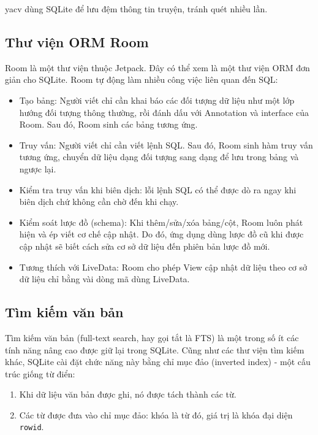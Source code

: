 \documentclass[../../thesis]{subfiles}
\begin{document}
yacv dùng SQLite để lưu đệm thông tin truyện, tránh quét nhiều lần.

\subsection{Thư viện ORM Room}\label{sec:room}

Room là một thư viện thuộc Jetpack. Đây có thể xem là một thư viện ORM đơn giản
cho SQLite. Room tự động làm nhiều công việc liên quan đến SQL:

\begin{itemize}
    \item
        Tạo bảng: Người viết chỉ cần khai báo các đối tượng dữ liệu như một lớp
        hướng đối tượng thông thường, rồi đánh dấu với Annotation và interface
        của Room. Sau đó, Room sinh các bảng tương ứng.
    \item
        Truy vấn: Người viết chỉ cần viết lệnh SQL. Sau đó, Room sinh hàm truy
        vấn tương ứng, chuyển dữ liệu dạng đối tượng sang dạng để lưu trong bảng
        và ngược lại.
    \item
        Kiểm tra truy vấn khi biên dịch: lỗi lệnh SQL có thể được dò ra ngay khi
        biên dịch chứ không cần chờ đến khi chạy.
    \item
        Kiểm soát lược đồ (schema): Khi thêm/sửa/xóa bảng/cột, Room luôn phát
        hiện và ép viết cơ chế cập nhật. Do đó, ứng dụng dùng lược đồ cũ khi
        được cập nhật sẽ biết cách sửa cơ sở dữ liệu đến phiên bản lược đồ mới.
    \item
        Tương thích với LiveData: Room cho phép View cập nhật dữ liệu theo cơ sở
        dữ liệu chỉ bằng vài dòng mã dùng LiveData.
\end{itemize}

\subsection{Tìm kiếm văn bản}\label{sec:fts}

Tìm kiếm văn bản (full-text search, hay gọi tắt là FTS) là một trong số ít các
tính năng nâng cao được giữ lại trong SQLite. Cũng như các thư viện tìm kiếm
khác, SQLite cài đặt chức năng này bằng chỉ mục đảo (inverted index) - một cấu
trúc giống từ điển:

\begin{enumerate}
    \item
        Khi dữ liệu văn bản được ghi, nó được tách thành các từ.
    \item
        Các từ được đưa vào chỉ mục đảo: khóa là từ đó, giá trị là khóa đại diện
        \texttt{rowid}.
\end{enumerate}
\end{document}
